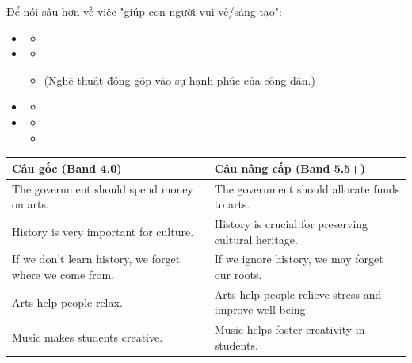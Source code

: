 \documentclass{../templateWriting/cdwriting}
\begin{document}
Để nói sâu hơn về việc "giúp con người vui vẻ/sáng tạo":
\begin{itemize}
\item {}
\begin{itemize}
\item {}
\end{itemize}
\item {}
\begin{itemize}
\item {}
\item (Nghệ thuật đóng góp vào sự hạnh phúc của công dân.)
\end{itemize}
\item {}
\begin{itemize}
\item {}
\end{itemize}
\item {}
\begin{itemize}
\item {}
\item {}
\end{itemize}
\end{itemize}
\begin{cdtablebox}
\renewcommand{\arraystretch}{1.25}
\begin{tabularx}{\linewidth}{>{\raggedright\arraybackslash}X>{\raggedright\arraybackslash}X}
\rowcolor{topicblue!12}\textbf{Câu gốc (Band 4.0)} & \textbf{Câu nâng cấp (Band 5.5+)} \\
\hline
The government should spend money on arts. & The government should allocate funds to arts. \\
\hline
History is very important for culture. & History is crucial for preserving cultural heritage. \\
\hline
If we don't learn history, we forget where we come from. & If we ignore history, we may forget our roots. \\
\hline
Arts help people relax. & Arts help people relieve stress and improve well-being. \\
\hline
Music makes students creative. & Music helps foster creativity in students. \\
\hline
\end{tabularx}
\end{cdtablebox}
\end{document}
